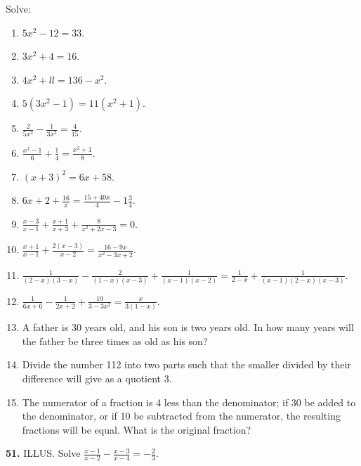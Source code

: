 \documentclass{book}
\begin{document}
Solve:
\begin{enumerate}
\item $5x^2-12 = 33$.

\item $3x^2+4 = 16$.

\item $4x^2+ll = 136-x^2$.

\item $5(3x^2-1) = 11(x^2+1)$.

\item $\displaystyle \frac{2}{5x^2}-\frac{1}{3x^2} =
\frac{4}{15}$.

\item $\displaystyle \frac{x^2-1}{6}+\frac{1}{4} =
\frac{x^2+1}{8}$.

\item $(x+3)^2 = 6x+58$.

\item $\displaystyle 6x+2+\frac{16}{x} =
\frac{15+40x}{4}-1\frac{3}{4}$.

\item $\displaystyle
\frac{x-3}{x-1}+\frac{x+1}{x+3}+\frac{8}{x^2+2x-3} = 0$.

\item $\displaystyle \frac{x+1}{x-1}+\frac{2(x-3)}{x-2} =
\frac{16-9x}{x^2-3x+2}$.

\item $\displaystyle
\frac{1}{(2-x)(3-x)}-\frac{2}{(1-x)(x-3)}+\frac{1}{(x-1)(x-2)} =
\frac{1}{2-x}+\frac{1}{(x-1)(2-x)(x-3)}$.

\item $\displaystyle
\frac{1}{6x+6}-\frac{1}{2x+2}+\frac{10}{3-3x^2} =
\frac{x}{3(1-x)}$.

\item A father is 30 years old, and his son is two years
old. In how many years will the father be three times as
old as his son?

\item Divide the number 112 into two parts such that the
smaller divided by their difference will give as a quotient
3.

\item The numerator of a fraction is 4 less than the denominator;
if 30 be added to the denominator, or if 10 be subtracted
from the numerator, the resulting fractions will
be equal. What is the original fraction?

\end{enumerate}
\textbf{ 51.} ILLUS. Solve
$\frac{x-1}{x-2}-\frac{x-3}{x-4}=-\frac{2}{3}$.
\end{document}
